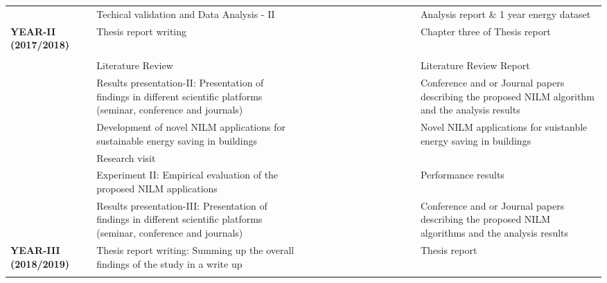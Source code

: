 \begin{landscape}
\begin{table}
{\begin{tabular}{|p{4cm}|p{9cm}|l|l|l|l|l|l|l|l|l|l|l|l|p{7cm}|}
 & Techical validation and Data Analysis - II  &  &  &  &  &  &  &  &  &  &\cellcolor[HTML]{000000}  &  &  &  Analysis report \& 1 year energy dataset\\ \cline{2-15}  
\multirow{-6}{*}{\textbf{YEAR-II (2017/2018)}} & Thesis report writing &  &  &  &  &  &  &  &  &  & \cellcolor[HTML]{000000} & \cellcolor[HTML]{000000} & \cellcolor[HTML]{000000} & Chapter three of Thesis report \\ \hline
\rowcolor[HTML]{000000} 
 &  &  &  &  &  &  &  &  &  &  &  &  &  &  \\ \hline
 & Literature Review & \cellcolor[HTML]{000000} & \cellcolor[HTML]{000000} & \cellcolor[HTML]{000000} & \cellcolor[HTML]{000000} & \cellcolor[HTML]{000000} & \cellcolor[HTML]{000000} & \cellcolor[HTML]{000000} & \cellcolor[HTML]{000000} & \cellcolor[HTML]{000000} & \cellcolor[HTML]{000000} & \cellcolor[HTML]{000000} &  & Literature Review Report \\ \cline{2-15} 
 & Results presentation-II: Presentation of findings in different scientific platforms (seminar, conference and journals) & \cellcolor[HTML]{000000} &  &  &  &  &  &  &  &  &  &  &  & Conference and or Journal papers describing the proposed NILM algorithm and the analysis results \\ \cline{2-15} 
 & Development of  novel NILM applications for sustainable energy saving in buildings &  & \cellcolor[HTML]{000000} & \cellcolor[HTML]{000000} & \cellcolor[HTML]{000000} & \cellcolor[HTML]{000000} & \cellcolor[HTML]{000000} & \cellcolor[HTML]{000000} & \cellcolor[HTML]{000000} & \cellcolor[HTML]{000000} &  &  &  & Novel NILM applications for suistanble energy saving in buildings \\ \cline{2-15} 
 & Research visit  &  &  &  &  & \cellcolor[HTML]{000000} & \cellcolor[HTML]{000000} & \cellcolor[HTML]{000000} & &  &  & & &\\ \cline{2-15}
 & Experiment II: Empirical evaluation of the proposed NILM applications &  &  &  &  &  &  & \cellcolor[HTML]{000000} & \cellcolor[HTML]{000000} & \cellcolor[HTML]{000000} & \cellcolor[HTML]{000000} &  &  & Performance results \\ \cline{2-15} 
 & Results presentation-III: Presentation of findings in different scientific platforms (seminar, conference and journals) &  &  &  &  &  &  &  & \cellcolor[HTML]{000000} &  &  &  &  & Conference and or Journal papers describing the proposed NILM algorithms and the analysis results \\ \cline{2-15} 
\multirow{-6}{*}{\textbf{YEAR-III (2018/2019)}} & Thesis report writing: Summing up the overall findings of the study in a write up &  &  &  &  &  &  &  & \cellcolor[HTML]{000000} & \cellcolor[HTML]{000000} & \cellcolor[HTML]{000000} & \cellcolor[HTML]{000000} & \cellcolor[HTML]{000000} & Thesis report \\ \hline
\rowcolor[HTML]{000000} 
\multicolumn{15}{|l|}{\cellcolor[HTML]{000000}} \\ \hline
\end{tabular}%
}
\label{tab:schedule}%
\end{table}
\end{landscape}